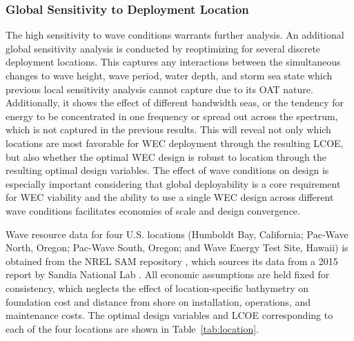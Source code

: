 
\subsubsection{Global Sensitivity to Deployment Location}
The high sensitivity to wave conditions warrants further analysis.
An additional global sensitivity analysis is conducted by reoptimizing for several discrete deployment locations.
This captures any interactions between the simultaneous changes to wave height, wave period, water depth, and storm sea state which previous local sensitivity analysis cannot capture due to its OAT nature.
Additionally, it shows the effect of different bandwidth seas, or the tendency for energy to be concentrated in one frequency or spread out across the spectrum, which is not captured in the previous results.
This will reveal not only which locations are most favorable for WEC deployment through the resulting LCOE, but also whether the optimal WEC design is robust to location through the resulting optimal design variables.
The effect of wave conditions on design is especially important considering that global deployability is a core requirement for WEC viability \cite{bull_systems_2017} and the ability to use a single WEC design across different wave conditions facilitates economies of scale and design convergence.

Wave resource data for four U.S. locations (Humboldt Bay, California; Pac-Wave North, Oregon; Pac-Wave South, Oregon; and Wave Energy Test Site, Hawaii) is obtained from the NREL SAM repository \cite{janzou_sam_2022}, which sources its data from a 2015 report by Sandia National Lab \cite{dallman_characterization_2015}.
All economic assumptions are held fixed for consistency, which neglects the effect of location-specific bathymetry on foundation cost and distance from shore on installation, operations, and maintenance costs.
The optimal design variables and LCOE corresponding to each of the four locations are shown in Table~\ref{tab:location}.

